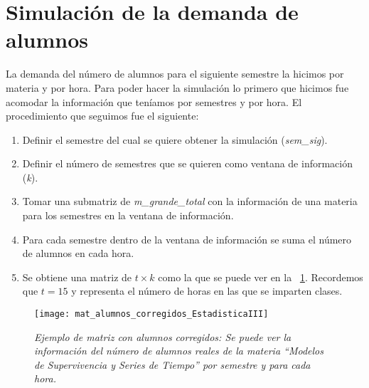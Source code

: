 \section{Simulación de la demanda de alumnos} \label{SimDemandaAlumnos}

La demanda del número de alumnos para el siguiente semestre la hicimos por materia y por hora. Para poder hacer la simulación lo primero que hicimos fue acomodar la información que teníamos por semestres y por hora. El procedimiento que seguimos fue el siguiente:
  
  \begin{enumerate}
\item Definir el semestre del cual se quiere obtener la simulación (\textit{sem\_sig}).

\item Definir el número de semestres que se quieren como ventana de información (\textit{k}).

\item Tomar una submatriz de \textit{m\_grande\_total} con la información de una materia para los semestres en la ventana de información.

\item Para cada semestre dentro de la ventana de información se suma el número de alumnos en cada hora.

\item Se obtiene una matriz de $t \times k$ como la que se puede ver en la \figurename{~\ref{matAl_corregidos}}. Recordemos que $t = 15$ y representa el número de horas en las que se imparten clases.
\end{enumerate}

\begin{figure}[H]
\centering
\texttt{[image: mat\_alumnos\_corregidos\_EstadisticaIII]} %
\caption[\textit{Ejemplo de matriz con alumnos corregidos}]{\textit{Ejemplo de matriz con alumnos corregidos: Se puede ver la información del número de alumnos reales de la materia ``Modelos de Supervivencia y Series de Tiempo'' por semestre y para cada hora.}}\label{matAl_corregidos}
\end{figure}


